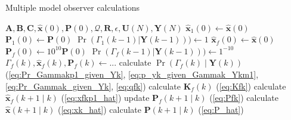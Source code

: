 \begin{algorithm}
	\caption{Multiple model observer calculations}  \label{alg:afmm}
	\begin{algorithmic}
			\Require $\mathbf{A},\mathbf{B},\mathbf{C},\mathbf{\hat{x}}(0), \mathbf{P}(0), \mathcal{Q}, \mathbf{R}, \epsilon, \mathbf{U}(N), \mathbf{Y}(N)$
			\State $\mathbf{\hat{x}}_1(0) \gets \mathbf{\hat{x}}(0)$    %
			\State $\mathbf{P}_1(0) \gets \mathbf{P}(0)$
			\State $\Pr(\Gamma_1(k-1)|\mathbf{Y}(k-1))) \gets 1$
			\State $\mathbf{\hat{x}}_f(0) \gets \mathbf{\hat{x}}(0)$
			\State $\mathbf{P}_f(0) \gets 10^{10}\mathbf{P}(0)$
			\State $\Pr(\Gamma_f(k-1)|\mathbf{Y}(k-1))) \gets 1^{-10}$
			\EndFor
			\State $\Gamma_f(k), \mathbf{\hat{x}}_f(k), \mathbf{P}_f(k) \gets ...$   %
			\State calculate $\Pr(\Gamma_f(k) \mid \mathbf{Y}(k))$ (\ref{eq:Pr_Gammakp1_given_Yk}, \ref{eq:p_yk_given_Gammak_Ykm1}, \ref{eq:Pr_Gammak_given_Yk}, \ref{eq:qfk})
			\State calculate $\mathbf{K}_f(k)$ (\ref{eq:Kfk}) 
			\State calculate $\mathbf{\hat{x}}_f(k+1 \mid k)$ (\ref{eq:xfkp1_hat})
			\State update $\mathbf{P}_f(k+1 \mid k)$ (\ref{eq:Pfk})
			\EndFor
			\State calculate $\mathbf{\hat{x}}(k+1 \mid k)$ (\ref{eq:xk_hat}) 
			\State calculate $\mathbf{P}(k+1 \mid k)$ (\ref{eq:P_hat})   %
			\EndFor
		\end{algorithmic}
\end{algorithm}

